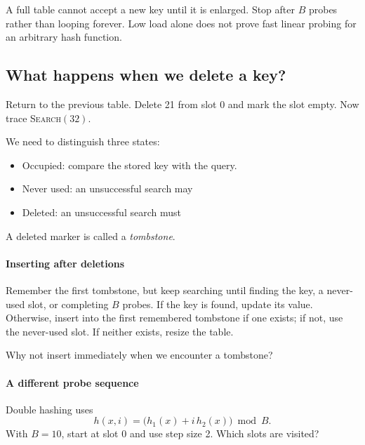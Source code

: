 \documentclass[11pt]{article}
\begin{document}
\vfill
A full table cannot accept a new key until it is enlarged. Stop after $B$
probes rather than looping forever. Low load alone does not prove fast linear
probing for an arbitrary hash function.

\newpage
\subsection*{What happens when we delete a key?}
Return to the previous table. Delete 21 from slot 0 and mark the slot empty.
Now trace \textsc{Search}$(32)$.
\vs{.8cm}

We need to distinguish three states:
\begin{itemize}
    \item Occupied: compare the stored key with the query.
    \item Never used: an unsuccessful search may 
    \item Deleted: an unsuccessful search must 
\end{itemize}
A deleted marker is called a \emph{tombstone}.

\paragraph{Inserting after deletions}
Remember the first tombstone, but keep searching until finding the key,
a never-used slot, or completing $B$ probes. If the key is found, update its
value. Otherwise, insert into the first remembered tombstone if one exists;
if not, use the never-used slot. If neither exists, resize the table.

Why not insert immediately when we encounter a tombstone?
\vs{.6cm}

\paragraph{A different probe sequence}
Double hashing uses
\begin{equation*}
    h(x,i)=\bigl(h_1(x)+i\,h_2(x)\bigr)\bmod B.
\end{equation*}
With $B=10$, start at slot 0 and use step size 2. Which slots are visited?
\vs{.6cm}
\end{document}

